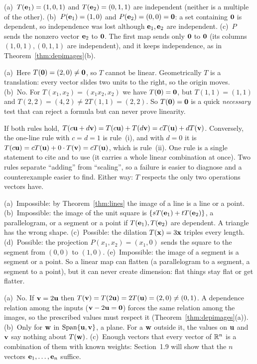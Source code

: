 \documentclass[11pt]{article}
\begin{document}
\begin{description}[leftmargin=0pt,itemsep=5pt]
  \item[Knowledge Check \ref{kc:images2}.] (a)~$T(\mathbf{e}_1)=(1,0,1)$ and $T(\mathbf{e}_2)=(0,1,1)$ are independent (neither is a multiple of the other). (b)~$P(\mathbf{e}_1)=(1,0)$ and $P(\mathbf{e}_2)=(0,0)=\mathbf{0}$: a set containing $\mathbf{0}$ is dependent, so independence was lost although $\mathbf{e}_1,\mathbf{e}_2$ are independent. (c)~$P$ sends the nonzero vector $\mathbf{e}_2$ to $\mathbf{0}$. The first map sends only $\mathbf{0}$ to $\mathbf{0}$ (its columns $(1,0,1),(0,1,1)$ are independent), and it keeps independence, as in Theorem~\ref{thm:depimages}(b).
  \item[Pause and think \ref{think:origin}.] (a)~Here $T(\mathbf{0})=(2,0)\neq\mathbf{0}$, so $T$ cannot be linear. Geometrically $T$ is a translation: every vector slides two units to the right, so the origin moves. (b)~No. For $T(x_1,x_2)=(x_1x_2,x_2)$ we have $T(\mathbf{0})=\mathbf{0}$, but $T(1,1)=(1,1)$ and $T(2,2)=(4,2)\neq2T(1,1)=(2,2)$. So $T(\mathbf{0})=\mathbf{0}$ is a quick \emph{necessary} test that can reject a formula but can never prove linearity.
  \item[Pause and think \ref{think:onerule}.] If both rules hold, $T(c\mathbf{u}+d\mathbf{v})=T(c\mathbf{u})+T(d\mathbf{v})=cT(\mathbf{u})+dT(\mathbf{v})$. Conversely, the one-line rule with $c=d=1$ is rule~(i), and with $d=0$ it is $T(c\mathbf{u})=cT(\mathbf{u})+0\cdot T(\mathbf{v})=cT(\mathbf{u})$, which is rule~(ii). One rule is a single statement to cite and to use (it carries a whole linear combination at once). Two rules separate ``adding'' from ``scaling'', so a failure is easier to diagnose and a counterexample easier to find. Either way: $T$ respects the only two operations vectors have.
  \item[Pause and think \ref{think:shapes}.] (a)~Impossible: by Theorem~\ref{thm:lines} the image of a line is a line or a point. (b)~Impossible: the image of the unit square is $\{sT(\mathbf{e}_1)+tT(\mathbf{e}_2)\}$, a parallelogram, or a segment or a point if $T(\mathbf{e}_1),T(\mathbf{e}_2)$ are dependent. A triangle has the wrong shape. (c)~Possible: the dilation $T(\mathbf{x})=3\mathbf{x}$ triples every length. (d)~Possible: the projection $P(x_1,x_2)=(x_1,0)$ sends the square to the segment from $(0,0)$ to $(1,0)$. (e)~Impossible: the image of a segment is a segment or a point. So a linear map can flatten (a parallelogram to a segment, a segment to a point), but it can never create dimension: flat things stay flat or get flatter.
  \item[Pause and think \ref{think:determined}.] (a)~No. If $\mathbf{v}=2\mathbf{u}$ then $T(\mathbf{v})=T(2\mathbf{u})=2T(\mathbf{u})=(2,0)\neq(0,1)$. A dependence relation among the inputs ($\mathbf{v}-2\mathbf{u}=\mathbf{0}$) forces the same relation among the images, so the prescribed values must respect it (Theorem~\ref{thm:depimages}(a)). (b)~Only for $\mathbf{w}$ in $\operatorname{Span}\{\mathbf{u},\mathbf{v}\}$, a plane. For a $\mathbf{w}$ outside it, the values on $\mathbf{u}$ and $\mathbf{v}$ say nothing about $T(\mathbf{w})$. (c)~Enough vectors that every vector of $\mathbb{R}^n$ is a combination of them with known weights: Section~1.9 will show that the $n$ vectors $\mathbf{e}_1,\dots,\mathbf{e}_n$ suffice.

\end{description}
\end{document}
